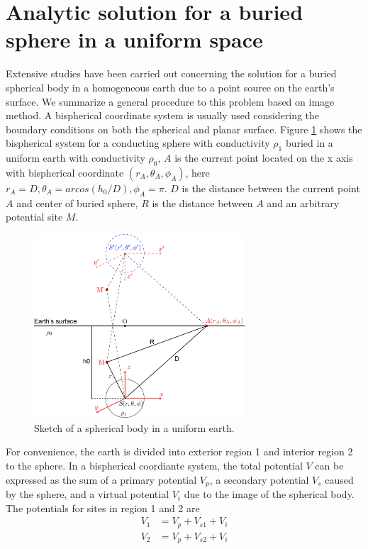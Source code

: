 \documentclass[11pt,letterpaper,leqno]{amsart}
\numberwithin{equation}{section}
\begin{document}
\section{Analytic solution for a buried sphere in a uniform space} 
Extensive studies have been carried out concerning the solution for a buried spherical body in a homogeneous earth due to a point source on the earth's surface. We summarize a general procedure to this problem based on image method. A bispherical coordinate system  is usually used considering the boundary conditions on both the spherical and planar surface. 
Figure \ref{fig:sketch} shows the bispherical system for a conducting sphere with conductivity $\rho_1$ buried in a uniform earth with conductivity $\rho_0$, $A$ is the current point located on the x axis with bispherical coordinate $(r_A,\theta_A,\phi_A)$, here $r_A=D, \theta_A=arcos(h_0/D), \phi_A=\pi$. $D$ is the distance between the current point $A$ and center of buried sphere, $R$ is the distance between $A$ and an arbitrary potential site $M$. 
\begin{figure}[h!]
\centering
\includegraphics[width=0.7\textwidth]{sketch.jpg}
\caption{Sketch of a spherical body in a uniform earth.}
\label{fig:sketch}
\end{figure}
For convenience, the earth is divided into exterior region 1 and interior region 2 to the sphere.  In a bispherical coordiante system, the total potential $V$ can be expressed as the sum of a primary potential $V_p$, a secondary potential $V_s$ caused by the sphere, and a virtual potential $V_i$ due to the image of the spherical body. The potentials for sites in region 1 and 2 are
\begin{align}
V_1 &= V_p + V_{s1} + V_i \\
V_2 &= V_p + V_{s2} + V_i
\end{align}
\end{document}
